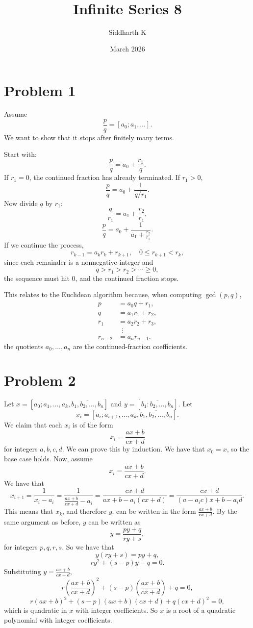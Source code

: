 \documentclass{article}
\title{Infinite Series 8}
\author{Siddharth K}
\date{March 2026}
\newcommand{\bigp}[1]{\left(#1\right)}
\begin{document}
\maketitle

\section*{Problem 1}
Assume
$$\frac{p}{q} = [a_0; a_1, \ldots].$$
We want to show that it stops after finitely many terms.

Start with:
$$\frac{p}{q} = a_0 + \frac{r_1}{q}.$$
If $r_1 = 0$, the continued fraction has already terminated. If $r_1 > 0$,
$$\frac{p}{q} = a_0 + \frac{1}{q/r_1}.$$
Now divide $q$ by $r_1$:
$$\frac{q}{r_1} = a_1 + \frac{r_2}{r_1},$$
$$\frac{p}{q} = a_0 + \frac{1}{a_1 + \frac{r_2}{r_1}}.$$
If we continue the process,
$$r_{k - 1} = a_kr_k + r_{k + 1}, \quad 0 \le r_{k + 1} < r_k,$$
since each remainder is a nonnegative integer and
$$q > r_1 > r_2 > \cdots \ge 0,$$
the sequence must hit $0$, and the continued fraction stops.

This relates to the Euclidean algorithm because, when computing $\gcd(p, q)$,
\begin{align*}
p &= a_0q + r_1, \\
q &= a_1r_1 + r_2, \\
r_1 &= a_2r_2 + r_3, \\
&\;\;\vdots \\
r_{n - 2} &= a_nr_{n - 1}.
\end{align*}
the quotients $a_0, \ldots, a_n$ are the continued-fraction coefficients.

\section*{Problem 2}
Let $x = [a_0; a_1, \ldots, a_k, \overline{b_1, b_2, \ldots, b_n}]$ and $y = [\overline{b_1: b_2, \ldots, b_n}]$. Let
$$x_i = [a_i; a_{i + 1}, \ldots, a_k, \overline{b_1, b_2, \ldots, b_n}].$$
We claim that each $x_i$ is of the form
$$x_i = \frac{ax + b}{cx + d}$$
for integers $a, b, c, d$.
We can prove this by induction. We have that $x_0 = x$, so the base case holds. Now, assume
$$x_i = \frac{ax + b}{cx + d}.$$
We have that
$$x_{i + 1} = \frac{1}{x_i - a_i} = \frac{1}{\frac{ax + b}{cx + d} - a_i} = \frac{cx + d}{ax + b - a_i(cx + d)} = \frac{cx + d}{(a - a_ic)x + b - a_id}.$$
This means that $x_k$, and therefore $y$, can be written in the form $\frac{ax + b}{cx + d}$. By the same argument as before, $y$ can be written as
$$y = \frac{py + q}{ry + s},$$
for integers $p, q, r, s$. So we have that
$$y(ry + s) = py + q,$$
$$ry^2 + (s - p)y - q = 0.$$
Substituting $y = \frac{ax + b}{cx + d}$,
$$r\bigp{\frac{ax + b}{cx + d}}^2 + (s - p)\bigp{\frac{ax + b}{cx + d}} + q = 0,$$
$$r(ax + b)^2 + (s - p)(ax + b)(cx + d) + q(cx + d)^2 = 0,$$
which is quadratic in $x$ with integer coefficients. So $x$ is a root of a quadratic polynomial with integer coefficients.
\end{document}
